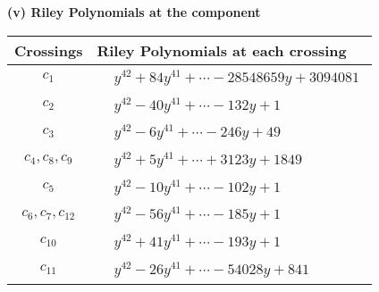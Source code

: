 \documentclass[1p]{elsarticle_modified}
\theoremstyle{definition}
\begin{document}
\newpage\renewcommand{\arraystretch}{1}
\flushleft \textbf{(v) Riley Polynomials at the component}\newline \\
\begin{tabular}{m{50pt}|m{274pt}}
Crossings & \hspace{64pt}Riley Polynomials at each crossing \\
\hline $$\begin{aligned}c_{1}\end{aligned}$$&$\begin{aligned}
&y^{42}+84 y^{41}+\cdots-28548659 y+3094081
\end{aligned}$\\
\hline $$\begin{aligned}c_{2}\end{aligned}$$&$\begin{aligned}
&y^{42}-40 y^{41}+\cdots-132 y+1
\end{aligned}$\\
\hline $$\begin{aligned}c_{3}\end{aligned}$$&$\begin{aligned}
&y^{42}-6 y^{41}+\cdots-246 y+49
\end{aligned}$\\
\hline $$\begin{aligned}c_{4},c_{8},c_{9}\end{aligned}$$&$\begin{aligned}
&y^{42}+5 y^{41}+\cdots+3123 y+1849
\end{aligned}$\\
\hline $$\begin{aligned}c_{5}\end{aligned}$$&$\begin{aligned}
&y^{42}-10 y^{41}+\cdots-102 y+1
\end{aligned}$\\
\hline $$\begin{aligned}c_{6},c_{7},c_{12}\end{aligned}$$&$\begin{aligned}
&y^{42}-56 y^{41}+\cdots-185 y+1
\end{aligned}$\\
\hline $$\begin{aligned}c_{10}\end{aligned}$$&$\begin{aligned}
&y^{42}+41 y^{41}+\cdots-193 y+1
\end{aligned}$\\
\hline $$\begin{aligned}c_{11}\end{aligned}$$&$\begin{aligned}
&y^{42}-26 y^{41}+\cdots-54028 y+841
\end{aligned}$\\
\hline
\end{tabular}\\~\\
\end{document}
